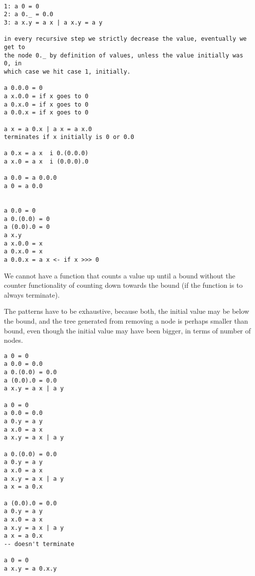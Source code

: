 

\begin{verbatim}

1: a 0 = 0
2: a 0._ = 0.0
3: a x.y = a x | a x.y = a y

in every recursive step we strictly decrease the value, eventually we get to
the node 0._ by definition of values, unless the value initially was 0, in
which case we hit case 1, initially.

a 0.0.0 = 0
a x.0.0 = if x goes to 0
a 0.x.0 = if x goes to 0
a 0.0.x = if x goes to 0

a x = a 0.x | a x = a x.0
terminates if x initially is 0 or 0.0

a 0.x = a x  i 0.(0.0.0)
a x.0 = a x  i (0.0.0).0

a 0.0 = a 0.0.0
a 0 = a 0.0


a 0.0 = 0
a 0.(0.0) = 0
a (0.0).0 = 0
a x.y
a x.0.0 = x
a 0.x.0 = x
a 0.0.x = a x <- if x >>> 0

\end{verbatim}

We cannot have a function that counts a value up until a bound without the
counter functionality of counting down towards the bound (if the function is to
always terminate).

The patterns have to be exhaustive, because both, the initial value may be
below the bound, and the tree generated from removing a node is perhaps smaller
than bound, even though the initial value may have been bigger, in terms of
number of nodes.


\begin{verbatim}
a 0 = 0
a 0.0 = 0.0
a 0.(0.0) = 0.0
a (0.0).0 = 0.0
a x.y = a x | a y

a 0 = 0
a 0.0 = 0.0
a 0.y = a y
a x.0 = a x
a x.y = a x | a y

a 0.(0.0) = 0.0
a 0.y = a y
a x.0 = a x
a x.y = a x | a y
a x = a 0.x

a (0.0).0 = 0.0
a 0.y = a y
a x.0 = a x
a x.y = a x | a y
a x = a 0.x
-- doesn't terminate

a 0 = 0
a x.y = a 0.x.y


\end{verbatim}

